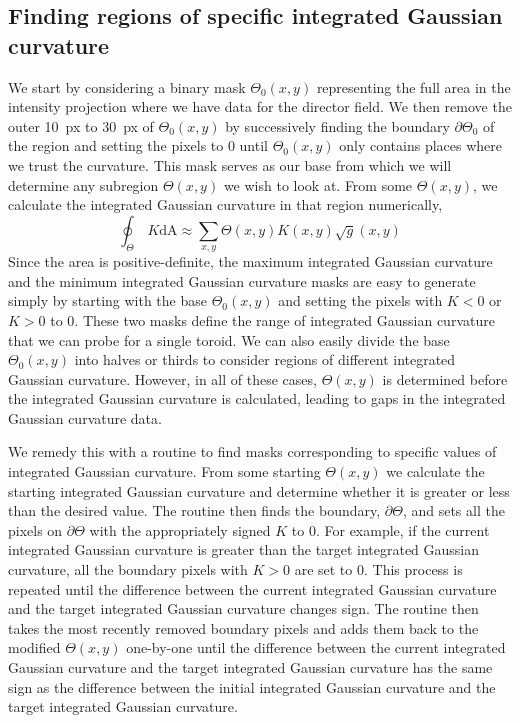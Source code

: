 \subsection{Finding regions of specific integrated Gaussian curvature}
We start by considering a binary mask $\Theta_0(x,y)$ representing the full area in the intensity projection where we have data for the director field.
We then remove the outer 10~px to 30~px of $\Theta_0(x,y)$ by successively finding the boundary $\partial \Theta_0$ of the region and setting the pixels to $0$ until $\Theta_0(x,y)$ only contains places where we trust the curvature.
This mask serves as our base from which we will determine any subregion $\Theta(x,y)$ we wish to look at.
From some $\Theta(x,y)$, we calculate the integrated Gaussian curvature in that region numerically,
\begin{equation}
  \oint_{\Theta}\,K\textrm{dA} \approx \sum\limits_{x,y} \Theta(x,y) K(x,y) \sqrt{g}(x,y)
\end{equation}
Since the area is positive-definite, the maximum integrated Gaussian curvature and the minimum integrated Gaussian curvature masks are easy to generate simply by starting with the base $\Theta_0(x,y)$ and setting the pixels with $K < 0$ or $K > 0$ to $0$.
These two masks define the range of integrated Gaussian curvature that we can probe for a single toroid.
We can also easily divide the base $\Theta_0(x,y)$ into halves or thirds to consider regions of different integrated Gaussian curvature.
However, in all of these cases, $\Theta(x,y)$ is determined before the integrated Gaussian curvature is calculated, leading to gaps in the integrated Gaussian curvature data.

We remedy this with a routine to find masks corresponding to specific values of integrated Gaussian curvature.
From some starting $\Theta(x,y)$ we calculate the starting integrated Gaussian curvature and determine whether it is greater or less than the desired value.
The routine then finds the boundary, $\partial \Theta$, and sets all the pixels on $\partial \Theta$ with the appropriately signed $K$ to $0$.
For example, if the current integrated Gaussian curvature is greater than the target integrated Gaussian curvature, all the boundary pixels with $K > 0$ are set to $0$.
This process is repeated until the difference between the current integrated Gaussian curvature and the target integrated Gaussian curvature changes sign.
The routine then takes the most recently removed boundary pixels and adds them back to the modified $\Theta(x,y)$ one-by-one until the difference between the current integrated Gaussian curvature and the target integrated Gaussian curvature has the same sign as the difference between the initial integrated Gaussian curvature and the target integrated Gaussian curvature.


